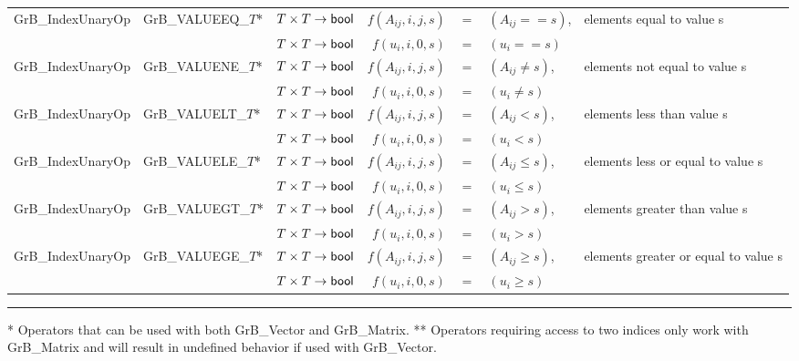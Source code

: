 \begin{landscape}
\begin{table}
\begin{threeparttable}
\begin{tabular}{l|l|l|rcll}
{\sf GrB\_IndexUnaryOp}   & {\sf GrB\_VALUEEQ\_$T$}*  & $T \times T \rightarrow {\sf bool} $ & $f(A_{ij},i,j,s)$ & $=$ & $(A_{ij} ==   s)$, & elements equal to value s \\
                          &                           & $T \times T \rightarrow {\sf bool} $ & $f(u_{i}, i,0,s)$ & $=$ & $(u_{i}  ==   s)$ \\
{\sf GrB\_IndexUnaryOp}   & {\sf GrB\_VALUENE\_$T$}*  & $T \times T \rightarrow {\sf bool} $ & $f(A_{ij},i,j,s)$ & $=$ & $(A_{ij} \neq s)$, & elements not equal to value s \\
                          &                           & $T \times T \rightarrow {\sf bool} $ & $f(u_{i}, i,0,s)$ & $=$ & $(u_{i}  \neq s)$ \\
{\sf GrB\_IndexUnaryOp}   & {\sf GrB\_VALUELT\_$T$}*  & $T \times T \rightarrow {\sf bool} $ & $f(A_{ij},i,j,s)$ & $=$ & $(A_{ij} <    s)$, & elements less than value s \\
                          &                           & $T \times T \rightarrow {\sf bool} $ & $f(u_{i}, i,0,s)$ & $=$ & $(u_{i}  <    s)$ \\
{\sf GrB\_IndexUnaryOp}   & {\sf GrB\_VALUELE\_$T$}*  & $T \times T \rightarrow {\sf bool} $ & $f(A_{ij},i,j,s)$ & $=$ & $(A_{ij} \leq s)$, & elements less or equal to value s \\
                          &                           & $T \times T \rightarrow {\sf bool} $ & $f(u_{i}, i,0,s)$ & $=$ & $(u_{i}  \leq s)$ \\
{\sf GrB\_IndexUnaryOp}   & {\sf GrB\_VALUEGT\_$T$}*  & $T \times T \rightarrow {\sf bool} $ & $f(A_{ij},i,j,s)$ & $=$ & $(A_{ij} >    s)$, & elements greater than value s \\
                          &                           & $T \times T \rightarrow {\sf bool} $ & $f(u_{i}, i,0,s)$ & $=$ & $(u_{i}  >    s)$ \\
{\sf GrB\_IndexUnaryOp}   & {\sf GrB\_VALUEGE\_$T$}*  & $T \times T \rightarrow {\sf bool} $ & $f(A_{ij},i,j,s)$ & $=$ & $(A_{ij} \geq s)$, & elements greater or equal to value s \\
                          &                           & $T \times T \rightarrow {\sf bool} $ & $f(u_{i}, i,0,s)$ & $=$ & $(u_{i}  \geq s)$ \\
\end{tabular}
\hrule
{\footnotesize
\hspace{0.065in}* Operators that can be used with both {\sf GrB\_Vector} and {\sf GrB\_Matrix}.\newline 
** Operators requiring access to two indices only work with {\sf GrB\_Matrix} and will result in undefined behavior if used with {\sf GrB\_Vector}. 
}
\end{threeparttable}
\end{table}

\end{landscape}

